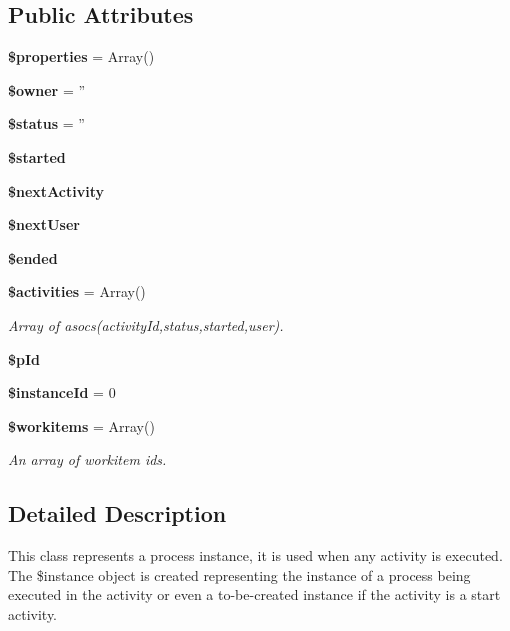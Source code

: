 \subsection*{Public Attributes}
\begin{CompactItemize}
\item 
{\bf \$properties} = Array()\label{classInstance_o0}

\item 
{\bf \$owner} = ''\label{classInstance_o1}

\item 
{\bf \$status} = ''\label{classInstance_o2}

\item 
{\bf \$started}\label{classInstance_o3}

\item 
{\bf \$next\-Activity}\label{classInstance_o4}

\item 
{\bf \$next\-User}\label{classInstance_o5}

\item 
{\bf \$ended}\label{classInstance_o6}

\item 
{\bf \$activities} = Array()\label{classInstance_o7}

\begin{CompactList}\small\item\em Array of asocs(activity\-Id,status,started,user). \item\end{CompactList}\item 
{\bf \$p\-Id}\label{classInstance_o8}

\item 
{\bf \$instance\-Id} = 0\label{classInstance_o9}

\item 
{\bf \$workitems} = Array()\label{classInstance_o10}

\begin{CompactList}\small\item\em An array of workitem ids. \item\end{CompactList}\end{CompactItemize}


\subsection{Detailed Description}
This class represents a process instance, it is used when any activity is executed. The \$instance object is created representing the instance of a process being executed in the activity or even a to-be-created instance if the activity is a start activity. 



